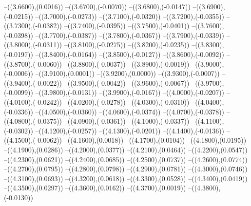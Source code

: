 {	--({\sx*(3.6600)},{\sy*(0.0016)})
	--({\sx*(3.6700)},{\sy*(-0.0070)})
	--({\sx*(3.6800)},{\sy*(-0.0147)})
	--({\sx*(3.6900)},{\sy*(-0.0215)})
	--({\sx*(3.7000)},{\sy*(-0.0273)})
	--({\sx*(3.7100)},{\sy*(-0.0320)})
	--({\sx*(3.7200)},{\sy*(-0.0355)})
	--({\sx*(3.7300)},{\sy*(-0.0382)})
	--({\sx*(3.7400)},{\sy*(-0.0395)})
	--({\sx*(3.7500)},{\sy*(-0.0401)})
	--({\sx*(3.7600)},{\sy*(-0.0398)})
	--({\sx*(3.7700)},{\sy*(-0.0387)})
	--({\sx*(3.7800)},{\sy*(-0.0367)})
	--({\sx*(3.7900)},{\sy*(-0.0339)})
	--({\sx*(3.8000)},{\sy*(-0.0311)})
	--({\sx*(3.8100)},{\sy*(-0.0275)})
	--({\sx*(3.8200)},{\sy*(-0.0235)})
	--({\sx*(3.8300)},{\sy*(-0.0197)})
	--({\sx*(3.8400)},{\sy*(-0.0164)})
	--({\sx*(3.8500)},{\sy*(-0.0127)})
	--({\sx*(3.8600)},{\sy*(-0.0092)})
	--({\sx*(3.8700)},{\sy*(-0.0060)})
	--({\sx*(3.8800)},{\sy*(-0.0037)})
	--({\sx*(3.8900)},{\sy*(-0.0019)})
	--({\sx*(3.9000)},{\sy*(-0.0006)})
	--({\sx*(3.9100)},{\sy*(0.0001)})
	--({\sx*(3.9200)},{\sy*(0.0000)})
	--({\sx*(3.9300)},{\sy*(-0.0007)})
	--({\sx*(3.9400)},{\sy*(-0.0022)})
	--({\sx*(3.9500)},{\sy*(-0.0042)})
	--({\sx*(3.9600)},{\sy*(-0.0067)})
	--({\sx*(3.9700)},{\sy*(-0.0099)})
	--({\sx*(3.9800)},{\sy*(-0.0131)})
	--({\sx*(3.9900)},{\sy*(-0.0167)})
	--({\sx*(4.0000)},{\sy*(-0.0207)})
	--({\sx*(4.0100)},{\sy*(-0.0242)})
	--({\sx*(4.0200)},{\sy*(-0.0278)})
	--({\sx*(4.0300)},{\sy*(-0.0310)})
	--({\sx*(4.0400)},{\sy*(-0.0336)})
	--({\sx*(4.0500)},{\sy*(-0.0360)})
	--({\sx*(4.0600)},{\sy*(-0.0374)})
	--({\sx*(4.0700)},{\sy*(-0.0378)})
	--({\sx*(4.0800)},{\sy*(-0.0375)})
	--({\sx*(4.0900)},{\sy*(-0.0361)})
	--({\sx*(4.1000)},{\sy*(-0.0337)})
	--({\sx*(4.1100)},{\sy*(-0.0302)})
	--({\sx*(4.1200)},{\sy*(-0.0257)})
	--({\sx*(4.1300)},{\sy*(-0.0201)})
	--({\sx*(4.1400)},{\sy*(-0.0136)})
	--({\sx*(4.1500)},{\sy*(-0.0062)})
	--({\sx*(4.1600)},{\sy*(0.0018)})
	--({\sx*(4.1700)},{\sy*(0.0104)})
	--({\sx*(4.1800)},{\sy*(0.0195)})
	--({\sx*(4.1900)},{\sy*(0.0286)})
	--({\sx*(4.2000)},{\sy*(0.0377)})
	--({\sx*(4.2100)},{\sy*(0.0464)})
	--({\sx*(4.2200)},{\sy*(0.0547)})
	--({\sx*(4.2300)},{\sy*(0.0621)})
	--({\sx*(4.2400)},{\sy*(0.0685)})
	--({\sx*(4.2500)},{\sy*(0.0737)})
	--({\sx*(4.2600)},{\sy*(0.0774)})
	--({\sx*(4.2700)},{\sy*(0.0795)})
	--({\sx*(4.2800)},{\sy*(0.0798)})
	--({\sx*(4.2900)},{\sy*(0.0781)})
	--({\sx*(4.3000)},{\sy*(0.0746)})
	--({\sx*(4.3100)},{\sy*(0.0693)})
	--({\sx*(4.3200)},{\sy*(0.0618)})
	--({\sx*(4.3300)},{\sy*(0.0528)})
	--({\sx*(4.3400)},{\sy*(0.0419)})
	--({\sx*(4.3500)},{\sy*(0.0297)})
	--({\sx*(4.3600)},{\sy*(0.0162)})
	--({\sx*(4.3700)},{\sy*(0.0019)})
	--({\sx*(4.3800)},{\sy*(-0.0130)})
}
